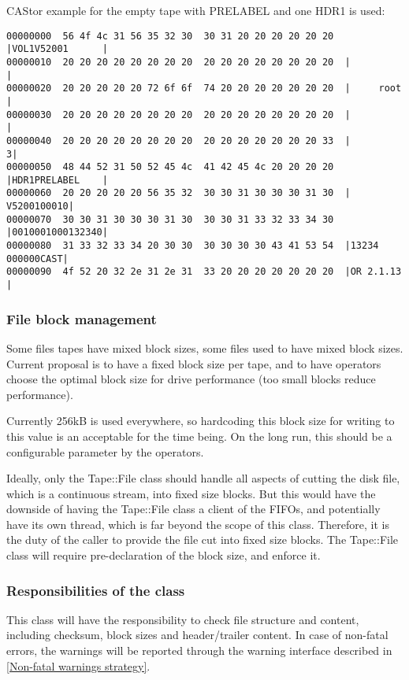 \begin{minipage}{\linewidth}
CAStor example for the empty tape with PRELABEL and one HDR1 is used:
\begin{small}
\begin{verbatim}
00000000  56 4f 4c 31 56 35 32 30  30 31 20 20 20 20 20 20  |VOL1V52001      |
00000010  20 20 20 20 20 20 20 20  20 20 20 20 20 20 20 20  |                |
00000020  20 20 20 20 20 72 6f 6f  74 20 20 20 20 20 20 20  |     root       |
00000030  20 20 20 20 20 20 20 20  20 20 20 20 20 20 20 20  |                |
00000040  20 20 20 20 20 20 20 20  20 20 20 20 20 20 20 33  |               3|
00000050  48 44 52 31 50 52 45 4c  41 42 45 4c 20 20 20 20  |HDR1PRELABEL    |
00000060  20 20 20 20 20 56 35 32  30 30 31 30 30 30 31 30  |     V5200100010|
00000070  30 30 31 30 30 30 31 30  30 30 31 33 32 33 34 30  |0010001000132340|
00000080  31 33 32 33 34 20 30 30  30 30 30 30 43 41 53 54  |13234 000000CAST|
00000090  4f 52 20 32 2e 31 2e 31  33 20 20 20 20 20 20 20  |OR 2.1.13       |
\end{verbatim}
\end{small}
\end{minipage}

\subsubsection{File block management}

Some files tapes have mixed block sizes,
some files used to have mixed block sizes. Current proposal is to have a fixed
block size per tape, and to have operators choose the optimal block size for 
drive performance (too small blocks reduce performance). 

Currently 256kB is used everywhere, so hardcoding this block size for writing 
to this value is an acceptable for the time being. On the long run, this should 
be a configurable parameter by the operators.

Ideally, only the Tape::File class should handle all aspects of cutting the disk
file, which is a continuous stream, into fixed size blocks. But this would have the 
downside of having the Tape::File class a client of the FIFOs, and potentially 
have its own thread, which is far beyond the scope of this class. Therefore, it 
is the duty of the caller to provide the file cut into fixed size blocks.
The Tape::File class will require pre-declaration of the block size, and 
enforce it.

\subsubsection{Responsibilities of the class}
This class will have the responsibility to check file structure and content,
including checksum, block sizes and header/trailer content. In case of non-fatal
errors, the warnings will be reported through the warning interface described in
\ref{Non-fatal warnings strategy}.

